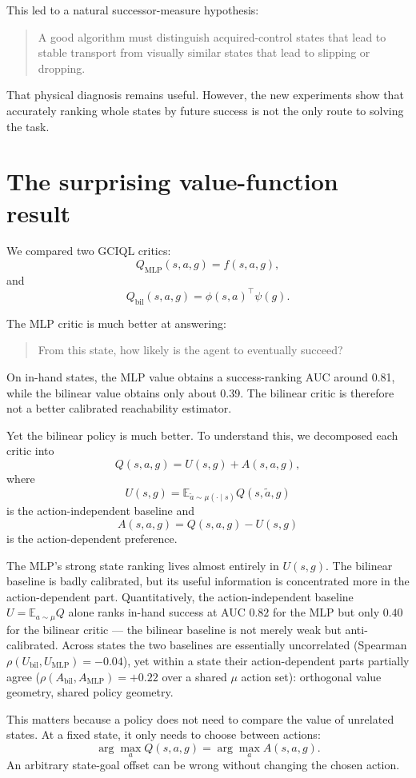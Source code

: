 \documentclass[12pt]{article}
\begin{document}
This led to a natural successor-measure hypothesis:
\begin{quote}
A good algorithm must distinguish acquired-control states that lead to stable transport from visually similar states that lead to slipping or dropping.
\end{quote}

That physical diagnosis remains useful. However, the new experiments show that accurately ranking whole states by future success is not the only route to solving the task.

\section*{The surprising value-function result}
We compared two GCIQL critics:
$$ Q_{\mathrm{MLP}}(s,a,g) = f(s,a,g), $$
and
$$ Q_{\mathrm{bil}}(s,a,g) = \phi(s,a)^\top\psi(g). $$

The MLP critic is much better at answering:
\begin{quote}
From this state, how likely is the agent to eventually succeed?
\end{quote}

On in-hand states, the MLP value obtains a success-ranking AUC around 0.81, while the bilinear value obtains only about 0.39. The bilinear critic is therefore not a better calibrated reachability estimator. 

Yet the bilinear policy is much better. To understand this, we decomposed each critic into
$$ Q(s,a,g) = U(s,g) + A(s,a,g), $$
where
$$ U(s,g) = \mathbb E_{\tilde a\sim\mu(\cdot\mid s)} Q(s,\tilde a,g) $$
is the action-independent baseline and
$$ A(s,a,g) = Q(s,a,g) - U(s,g) $$
is the action-dependent preference.

The MLP’s strong state ranking lives almost entirely in $U(s,g)$. The bilinear baseline is badly calibrated, but its useful information is concentrated more in the action-dependent part. Quantitatively, the action-independent baseline $U=\mathbb E_{a\sim\mu}Q$ alone ranks in-hand success at AUC $0.82$ for the MLP but only $0.40$ for the bilinear critic --- the bilinear baseline is not merely weak but anti-calibrated. Across states the two baselines are essentially uncorrelated (Spearman $\rho(U_{\mathrm{bil}},U_{\mathrm{MLP}})=-0.04$), yet within a state their action-dependent parts partially agree ($\rho(A_{\mathrm{bil}},A_{\mathrm{MLP}})=+0.22$ over a shared $\mu$ action set): orthogonal value geometry, shared policy geometry.

This matters because a policy does not need to compare the value of unrelated states. At a fixed state, it only needs to choose between actions:
$$ \arg\max_a Q(s,a,g) = \arg\max_a A(s,a,g). $$
An arbitrary state-goal offset can be wrong without changing the chosen action.
\end{document}
